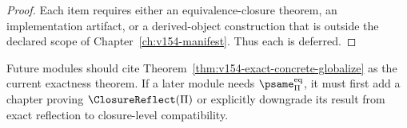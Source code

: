 \begin{proof}
Each item requires either an equivalence-closure theorem, an implementation artifact, or a derived-object construction that is outside the declared scope of Chapter~\ref{ch:v154-manifest}. Thus each is deferred.
\end{proof}

\begin{protocol}
\label{prot:v154-export-discipline}
Future modules should cite Theorem~\ref{thm:v154-exact-concrete-globalize} as the current exactness theorem. If a later module needs \(\psame_{\Pi}^{\mathrm{eq}}\), it must first add a chapter proving \(\ClosureReflect(\Pi)\) or explicitly downgrade its result from exact reflection to closure-level compatibility.
\end{protocol}
